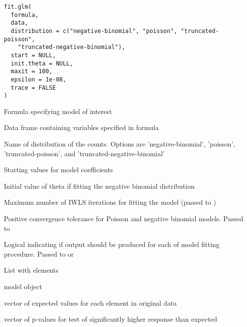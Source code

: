 \documentclass[letterpaper]{book}
\begin{document}
%
\begin{Usage}
\begin{verbatim}
fit.glm(
  formula,
  data,
  distribution = c("negative-binomial", "poisson", "truncated-poisson",
    "truncated-negative-binomial"),
  start = NULL,
  init.theta = NULL,
  maxit = 100,
  epsilon = 1e-08,
  trace = FALSE
)
\end{verbatim}
\end{Usage}
%
\begin{Arguments}
\begin{ldescription}
\item[\code{formula}] Formula specifying model of interest

\item[\code{data}] Data frame containing variables specified in formula

\item[\code{distribution}] Name of distribution of the counts. Options are 'negative-binomial',
'poisson', 'truncated-poisson', and 'truncated-negative-binomial'

\item[\code{start}] Starting values for model coefficients

\item[\code{init.theta}] Initial value of theta if fitting the negative binomial distribution

\item[\code{maxit}] Maximum number of IWLS iterations for fitting the model (passed to )

\item[\code{epsilon}] Positive convergence tolerance for Poisson and negative binomial models. Passed to 

\item[\code{trace}] Logical indicating if output should be produced for each of model fitting procedure. Passed to  or 
\end{ldescription}
\end{Arguments}
%
\begin{Value}
List with elements
\begin{ldescription}
\item[\code{model}] model object
\item[\code{expected.values}] vector of expected values for each element in original data
\item[\code{p.values}] vector of p-values for test of significantly higher response than expected
\end{ldescription}
\end{Value}
\end{document}
